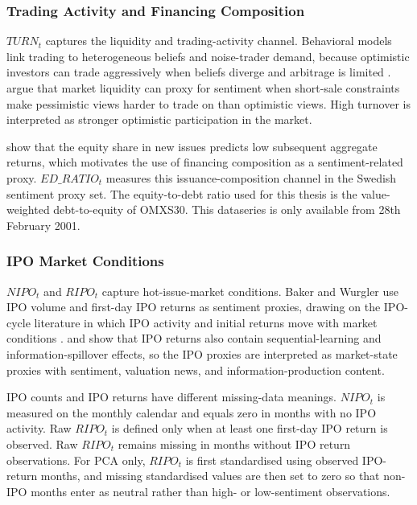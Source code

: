 \documentclass[11pt]{article}
\newcommand{\var}[1]{\ensuremath{#1}}
\begin{document}
\subsubsection{Trading Activity and Financing Composition}
\var{TURN_t} captures the liquidity and trading-activity channel. Behavioral models link trading to heterogeneous beliefs and noise-trader demand, because optimistic investors can trade aggressively when beliefs diverge and arbitrage is limited \citep{delong1990noise,miller1977divergence}. \citet{baker2004stein} argue that market liquidity can proxy for sentiment when short-sale constraints make pessimistic views harder to trade on than optimistic views. High turnover is interpreted as stronger optimistic participation in the market. 

\citet{baker2000equityshare} show that the equity share in new issues predicts low subsequent aggregate returns, which motivates the use of financing composition as a sentiment-related proxy. \var{ED\_RATIO_t} measures this issuance-composition channel in the Swedish sentiment proxy set. The equity-to-debt ratio used for this thesis is the value-weighted debt-to-equity of OMXS30. This dataseries is only available from 28th February 2001.

\subsubsection{IPO Market Conditions}
\var{NIPO_t} and \var{RIPO_t} capture hot-issue-market conditions. Baker and Wurgler use IPO volume and first-day IPO returns as sentiment proxies, drawing on the IPO-cycle literature in which IPO activity and initial returns move with market conditions \citep{ibbotson1975hot,ritter1991ipo,baker2006sentiment}. \citet{lowry2002ipo} and \citet{benveniste2003spillovers} show that IPO returns also contain sequential-learning and information-spillover effects, so the IPO proxies are interpreted as market-state proxies with sentiment, valuation news, and information-production content.

IPO counts and IPO returns have different missing-data meanings. \var{NIPO_t} is measured on the monthly calendar and equals zero in months with no IPO activity. Raw \var{RIPO_t} is defined only when at least one first-day IPO return is observed. Raw \var{RIPO_t} remains missing in months without IPO return observations. For PCA only, \var{RIPO_t} is first standardised using observed IPO-return months, and missing standardised values are then set to zero so that non-IPO months enter as neutral rather than high- or low-sentiment observations.
\end{document}

